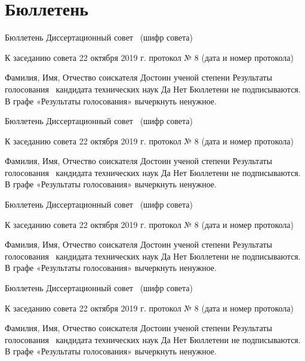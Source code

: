 

\section{Бюллетень}

Бюллетень
Диссертационный совет		\
(шифр совета)

К заседанию совета		22 октября 2019 г. протокол № 8
(дата и номер протокола)

Фамилия, Имя, Отчество соискателя	Достоин ученой степени	Результаты голосования
\thesisAuthorLastName~\thesisAuthorOtherNames	кандидата технических наук	Да
Нет
Бюллетени не подписываются. В графе «Результаты голосования» вычеркнуть ненужное.


Бюллетень
Диссертационный совет		\
(шифр совета)

К заседанию совета		22 октября 2019 г. протокол № 8
(дата и номер протокола)

Фамилия, Имя, Отчество соискателя	Достоин ученой степени	Результаты голосования
\thesisAuthorLastName~\thesisAuthorOtherNames	кандидата технических наук	Да
Нет
Бюллетени не подписываются. В графе «Результаты голосования» вычеркнуть ненужное.


Бюллетень
Диссертационный совет		\
(шифр совета)

К заседанию совета		22 октября 2019  г. протокол № 8
(дата и номер протокола)

Фамилия, Имя, Отчество соискателя	Достоин ученой степени	Результаты голосования
\thesisAuthorLastName~\thesisAuthorOtherNames	кандидата технических наук	Да
Нет
Бюллетени не подписываются. В графе «Результаты голосования» вычеркнуть ненужное.


Бюллетень
Диссертационный совет		\
(шифр совета)

К заседанию совета		22 октября 2019 г. протокол № 8
(дата и номер протокола)

Фамилия, Имя, Отчество соискателя	Достоин ученой степени	Результаты голосования
\thesisAuthorLastName~\thesisAuthorOtherNames	кандидата технических наук	Да
Нет
Бюллетени не подписываются. В графе «Результаты голосования» вычеркнуть ненужное.

\clearpage